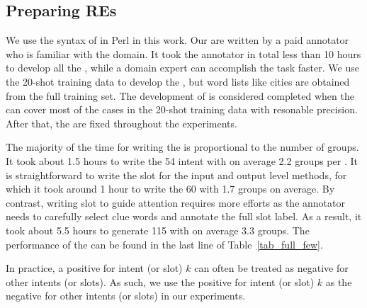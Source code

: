 \subsection{Preparing REs}
\label{re_in_exp} We use the syntax of \REs in Perl in this work. Our \REs are written by a paid annotator who is familiar with the domain.
It took the annotator in total less than 10 hours
to develop all the \REs, while a domain expert can accomplish the task faster.
We use the 20-shot training data to develop the \REs, but word lists
like cities are obtained from the full training set.
The development of \REs is considered completed when the \REs can cover most of the cases in the 20-shot training data with resonable precision.
After that, the \REs are fixed throughout the experiments.

The majority of the time
for %
writing the \REs is proportional to the number of \RE groups.
It took about 1.5 hours to write the 54 intent \REs with on average 2.2 groups per \RE. It is straightforward
to write the slot \REs for the input and output level methods, for which it took around
 1 hour to write the 60 \REs with 1.7 groups on average. By contrast, writing slot \REs to guide attention requires more
efforts as the annotator needs to carefully select clue words and annotate the full slot label. As a result, it took about
5.5 hours to generate 115 \REs with on average 3.3 groups.
The performance of the \REs can be found in the last line of Table~\ref{tab_full_few}.

In practice, a positive \RE for intent (or slot) $k$ can often be treated as negative \REs for other intents (or slots). As such, we use the positive \REs for intent (or slot) $k$ as the negative \REs for other intents (or slots) in our experiments.



